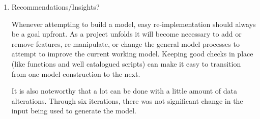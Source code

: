 \documentclass[10pt]{article}
\begin{document}
\begin{enumerate}[\null]
\item Recommendations/Insights?

\hspace{5mm} Whenever attempting to build a model, easy re-implementation should always be a goal upfront.  As a project unfolds it will become necessary to add or remove features,  re-manipulate, or change the general model processes to attempt to improve the current working model.  Keeping good checks in place (like functions and well catalogued scripts) can make it easy to transition from one model construction to the next.

\hspace{5mm} It is also noteworthy that a lot can be done with a little amount of data alterations.  Through six iterations, there was not significant change in the input being used to generate the model.  


\end{enumerate}

 
\end{document}

